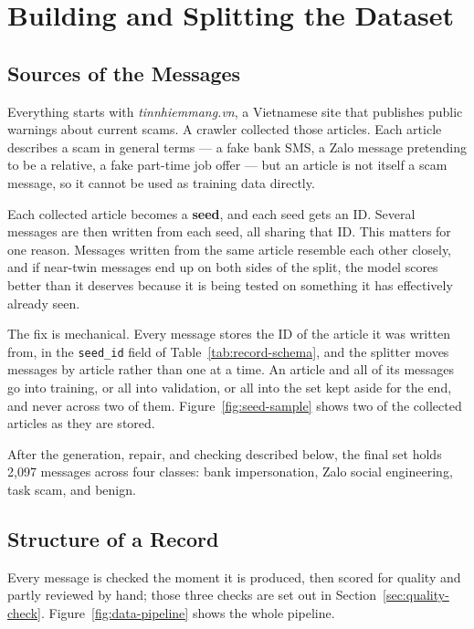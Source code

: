 \section{Building and Splitting the Dataset}

\subsection*{Sources of the Messages}

Everything starts with \textit{tinnhiemmang.vn}, a Vietnamese site that publishes public warnings about current scams. A crawler collected those articles. Each article describes a scam in general terms --- a fake bank SMS, a Zalo message pretending to be a relative, a fake part-time job offer --- but an article is not itself a scam message, so it cannot be used as training data directly.

Each collected article becomes a \textbf{seed}, and each seed gets an ID. Several messages are then written from each seed, all sharing that ID. This matters for one reason. Messages written from the same article resemble each other closely, and if near-twin messages end up on both sides of the split, the model scores better than it deserves because it is being tested on something it has effectively already seen.

The fix is mechanical. Every message stores the ID of the article it was written from, in the \texttt{seed\_id} field of Table~\ref{tab:record-schema}, and the splitter moves messages by article rather than one at a time. An article and all of its messages go into training, or all into validation, or all into the set kept aside for the end, and never across two of them. Figure~\ref{fig:seed-sample} shows two of the collected articles as they are stored.

After the generation, repair, and checking described below, the final set holds 2{,}097 messages across four classes: bank impersonation, Zalo social engineering, task scam, and benign.

\subsection*{Structure of a Record}

Every message is checked the moment it is produced, then scored for quality and partly reviewed by hand; those three checks are set out in Section~\ref{sec:quality-check}. Figure~\ref{fig:data-pipeline} shows the whole pipeline.

